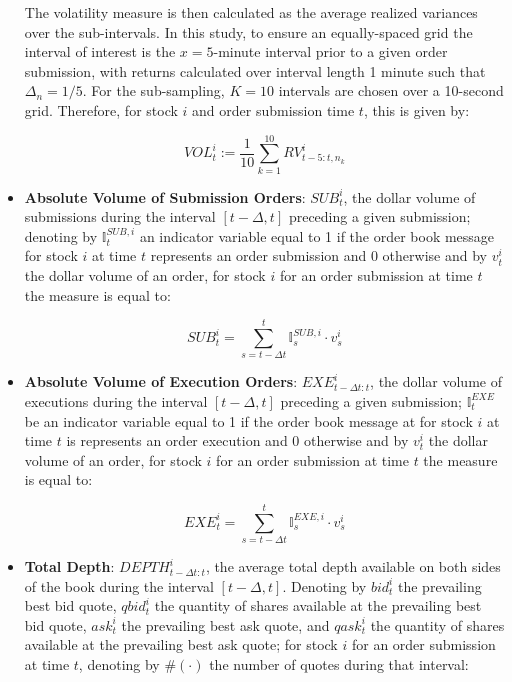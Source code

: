 \documentclass{article}
\begin{document}
\begin{itemize}
\noindent The volatility measure is then calculated as the average realized variances over the sub-intervals. In this study, to ensure an equally-spaced grid the interval of interest is the $x=5$-minute interval prior to a given order submission, with returns calculated over interval length 1 minute such that $\Delta_n = 1/5$. For the sub-sampling, $K=10$ intervals are chosen over a 10-second grid. Therefore, for stock $i$ and order submission time $t$, this is given by:

\begin{equation*}
VOL_{t}^i := \frac{1}{10} \sum_{k=1}^{10} RV_{t-5:t,{n_k}}^i
\end{equation*}

\item \textbf{Absolute Volume of Submission Orders}: $SUB_{t}^i$, the dollar volume of submissions during the interval $[t-\Delta,t]$ preceding a given submission; denoting by $\mathbb{I}_t^{SUB,i}$ an indicator variable equal to 1 if the order book message for stock $i$ at time $t$ represents an order submission and 0 otherwise and by $v_t^i$ the dollar volume of an order, for stock $i$ for an order submission at time $t$ the measure is equal to:

    \begin{equation*}\label{eq:absnum_pre}
    SUB_{t}^i = \sum_{s=t-\Delta t}^t \mathbb{I}_s^{SUB,i} \cdot v_s^i
    \end{equation*}

\item \textbf{Absolute Volume of Execution Orders}: $EXE_{t-\Delta t:t}^i$, the dollar volume of executions during the interval $[t-\Delta,t]$ preceding a given submission; $\mathbb{I}_{t}^{EXE}$ be an indicator variable equal to 1 if the order book message at for stock $i$ at time $t$ is represents an order execution and 0 otherwise and by $v_t^i$ the dollar volume of an order, for stock $i$ for an order submission at time $t$ the measure is equal to:

    \begin{equation*}\label{eq:absnum_pre}
    EXE_{t}^i = \sum_{s=t-\Delta t}^t \mathbb{I}_s^{EXE,i} \cdot v_s^i
    \end{equation*}

\item \textbf{Total Depth}: $DEPTH_{t-\Delta t:t}^i$, the average total depth available on both sides of the book during the interval $[t-\Delta,t]$. Denoting by $bid_t^i$ the prevailing best bid quote, $qbid_t^i$ the quantity of shares available at the prevailing best bid quote, $ask_t^i$ the prevailing best ask quote, and $qask_t^i$ the quantity of shares available at the prevailing best ask quote; for stock $i$ for an order submission at time $t$, denoting by $\#( \cdot)$ the number of quotes during that interval:


\end{itemize}
\end{document}
